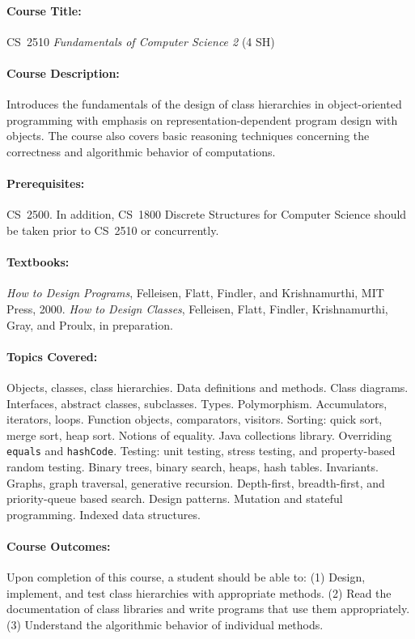 \documentclass[11pt]{article}
\begin{document}
\paragraph{Course Title:}
%
CS~2510 \emph{Fundamentals of Computer Science 2}	(4 SH)

\paragraph{Course Description:}
%

Introduces the fundamentals of the design of class hierarchies in
object-oriented programming with emphasis on representation-dependent
program design with objects. The course also covers basic reasoning
techniques concerning the correctness and algorithmic behavior of
computations.

\paragraph{Prerequisites:}
%
CS~2500. In addition, CS~1800 Discrete Structures for Computer Science should be taken prior to CS~2510 or concurrently.

\paragraph{Textbooks:}
%
\emph{How to Design Programs}, Felleisen, Flatt, Findler, and Krishnamurthi, MIT Press, 2000. \emph{How to Design Classes}, Felleisen, Flatt, Findler, Krishnamurthi, Gray, and Proulx, in preparation.

\paragraph{Topics Covered:}
%
Objects, classes, class hierarchies.  Data definitions and methods.
%
Class diagrams.
%
Interfaces, abstract classes, subclasses.  Types.  Polymorphism.
%
Accumulators, iterators, loops.
%
Function objects, comparators, visitors.  Sorting: quick sort, merge
sort, heap sort.  Notions of equality.
%
Java collections library.
%
Overriding {\tt equals} and {\tt hashCode}.
%
Testing: unit testing, stress testing, and property-based random testing.
%
Binary trees, binary search, heaps, hash tables.
%
Invariants.
%
Graphs, graph traversal, generative recursion.  Depth-first,
breadth-first, and priority-queue based search.
%
Design patterns.
%
Mutation and stateful programming.
%
Indexed data structures.

\paragraph{Course Outcomes:}
%
Upon completion of this course, a student should be able to: 
(1) Design, implement, and test class hierarchies with appropriate methods. 
(2) Read the documentation of class libraries and write programs that use them appropriately. 
(3) Understand the algorithmic behavior of individual methods.
\end{document}
